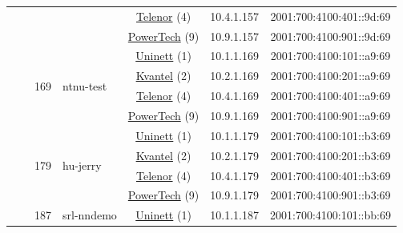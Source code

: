 \begin{small}
\begin{center}
\begin{longtable}{|c|c|c|c|c|c|c|c|}
  &  &  &  & \multicolumn{2}{|c|}{\tiny{\href{https://www.telenor.no}{Telenor} (4)}} & \tiny{10.4.1.157} & \tiny{2001:700:4100:401::9d:69} \\* \cline{5-5}\cline{6-6}\cline{7-7}\cline{8-8}
  &  &  &  & \multicolumn{2}{|c|}{\tiny{\href{http://www.powertech.no}{PowerTech} (9)}} & \tiny{10.9.1.157} & \tiny{2001:700:4100:901::9d:69} \\* \cline{3-3}\cline{4-4}\cline{5-5}\cline{6-6}\cline{7-7}\cline{8-8}
  &  & \multirow{4}{*}{\tiny{169}} & \multicolumn{1}{|l|}{\multirow{4}{*}{\tiny{ntnu-test}}} & \multicolumn{2}{|c|}{\tiny{\href{https://www.uninett.no}{Uninett} (1)}} & \tiny{10.1.1.169} & \tiny{2001:700:4100:101::a9:69} \\* \cline{5-5}\cline{6-6}\cline{7-7}\cline{8-8}
  &  &  &  & \multicolumn{2}{|c|}{\tiny{\href{http://kvantel.no}{Kvantel} (2)}} & \tiny{10.2.1.169} & \tiny{2001:700:4100:201::a9:69} \\* \cline{5-5}\cline{6-6}\cline{7-7}\cline{8-8}
  &  &  &  & \multicolumn{2}{|c|}{\tiny{\href{https://www.telenor.no}{Telenor} (4)}} & \tiny{10.4.1.169} & \tiny{2001:700:4100:401::a9:69} \\* \cline{5-5}\cline{6-6}\cline{7-7}\cline{8-8}
  &  &  &  & \multicolumn{2}{|c|}{\tiny{\href{http://www.powertech.no}{PowerTech} (9)}} & \tiny{10.9.1.169} & \tiny{2001:700:4100:901::a9:69} \\* \cline{3-3}\cline{4-4}\cline{5-5}\cline{6-6}\cline{7-7}\cline{8-8}
  &  & \multirow{4}{*}{\tiny{179}} & \multicolumn{1}{|l|}{\multirow{4}{*}{\tiny{hu-jerry}}} & \multicolumn{2}{|c|}{\tiny{\href{https://www.uninett.no}{Uninett} (1)}} & \tiny{10.1.1.179} & \tiny{2001:700:4100:101::b3:69} \\* \cline{5-5}\cline{6-6}\cline{7-7}\cline{8-8}
  &  &  &  & \multicolumn{2}{|c|}{\tiny{\href{http://kvantel.no}{Kvantel} (2)}} & \tiny{10.2.1.179} & \tiny{2001:700:4100:201::b3:69} \\* \cline{5-5}\cline{6-6}\cline{7-7}\cline{8-8}
  &  &  &  & \multicolumn{2}{|c|}{\tiny{\href{https://www.telenor.no}{Telenor} (4)}} & \tiny{10.4.1.179} & \tiny{2001:700:4100:401::b3:69} \\* \cline{5-5}\cline{6-6}\cline{7-7}\cline{8-8}
  &  &  &  & \multicolumn{2}{|c|}{\tiny{\href{http://www.powertech.no}{PowerTech} (9)}} & \tiny{10.9.1.179} & \tiny{2001:700:4100:901::b3:69} \\* \cline{3-3}\cline{4-4}\cline{5-5}\cline{6-6}\cline{7-7}\cline{8-8}
  &  & \multirow{4}{*}{\tiny{187}} & \multicolumn{1}{|l|}{\multirow{4}{*}{\tiny{srl-nndemo}}} & \multicolumn{2}{|c|}{\tiny{\href{https://www.uninett.no}{Uninett} (1)}} & \tiny{10.1.1.187} & \tiny{2001:700:4100:101::bb:69} \\* \cline{5-5}\cline{6-6}\cline{7-7}\cline{8-8}

\end{longtable}
\end{center}
\end{small}
